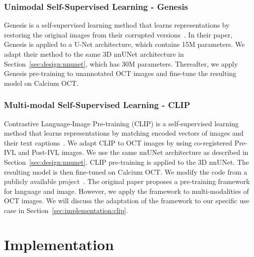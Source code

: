 \documentclass[a4paper,11pt,oneside]{report}
\begin{document}

\subsection{Unimodal Self-Supervised Learning - Genesis}
Genesis is a self-supervised learning method that learns representations by restoring the original images from their corrupted versions~\cite{Zhou2021}. In their paper, Genesis is applied to a U-Net architecture, which contains 15M parameters. We adapt their method to the same 3D nnUNet architecture in Section~\ref{sec:design:nnunet}, which has 30M parameters. Thereafter, we apply Genesis pre-training to unannotated OCT images and fine-tune the resulting model on Calcium OCT.


\subsection{Multi-modal Self-Supervised Learning - CLIP}
Contrastive Language-Image Pre-training (CLIP) is a self-supervised learning method that learns representations by matching encoded vectors of images and their text captions~\cite{Radford2021CLIP}. We adapt CLIP to OCT images by using co-registered Pre-IVL and Post-IVL images. We use the same nnUNet architecture as described in Section~\ref{sec:design:nnunet}. CLIP pre-training is applied to the 3D nnUNet. The resulting model is then fine-tuned on Calcium OCT. We modify the code from a publicly available project~\cite{Shariatnia2021}. The original paper proposes a pre-training framework for language and image. However, we apply the framework to multi-modalities of OCT images. We will discuss the adaptation of the framework to our specific use case in Section~\ref{sec:implementation:clip}.

\chapter{Implementation}


\end{document}
